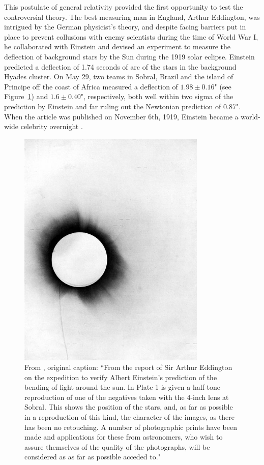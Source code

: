 This postulate of general relativity provided the first opportunity to test the controversial theory. The best measuring man in England, Arthur Eddington, was intrigued by the German physicist's theory, and despite facing barriers put in place to prevent collusions with enemy scientists during the time of World War I, he collaborated with Einstein and devised an experiment to measure the deflection of background stars by the Sun during the 1919 solar eclipse. Einstein predicted a deflection of 1.74 seconds of arc of the stars in the background Hyades cluster. On May 29, two teams in Sobral, Brazil and the island of Principe off the coast of Africa measured a deflection of $1.98\pm0.16$" (see Figure~\ref{intro:fig:eclipse}) and $1.6\pm0.40$", respectively, both well within two sigma of the prediction by Einstein and far ruling out the Newtonian prediction of 0.87". When the article was published on November 6th, 1919, Einstein became a world-wide celebrity overnight \citep{Dyson:1920zl}.

\begin{figure}
\centering
\includegraphics[width=0.8\textwidth]{Intro/1919_eclipse_negative.jpg}
\caption[Photometric plates from the 1919 solar eclipse]{From \citet{Dyson:1920zl}, original caption: ``From the report of Sir Arthur Eddington on the expedition to verify Albert Einstein's prediction of the bending of light around the sun. In Plate 1 is given a half-tone reproduction of one of the negatives taken with the 4-inch lens at Sobral. This shows the position of the stars, and, as far as possible in a reproduction of this kind, the character of the images, as there has been no retouching. A number of photographic prints have been made and applications for these from astronomers, who wish to assure themselves of the quality of the photographs, will be considered as as far as possible acceded to."}
\label{intro:fig:eclipse}
\end{figure}

